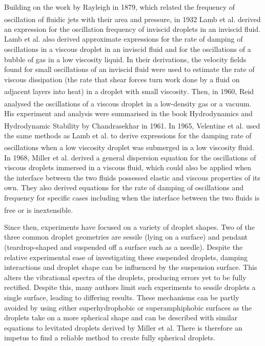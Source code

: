 \documentclass{physics_article_B}
\begin{document}
    Building on the work by Rayleigh in 1879, which related the frequency of oscillation of fluidic jets with their area and pressure\textsuperscript{\cite{rayleigh}}, in 1932 Lamb et al. derived an expression for the oscillation frequency of inviscid droplets in an inviscid fluid. Lamb et al. also derived approximate expressions for the rate of damping of oscillations in a viscous droplet in an inviscid fluid and for the oscillations of a bubble of gas in a low viscosity liquid. In their derivations, the velocity fields found for small oscillations of an inviscid fluid were used to estimate the rate of viscous dissipation (the rate that shear forces turn work done by a fluid on adjacent layers into heat) in a droplet with small viscosity\textsuperscript{\cite{lamb}}. Then, in 1960, Reid analysed the oscillations of a viscous droplet in a low-density gas or a vacuum\textsuperscript{\cite{reid}}. His experiment and analysis were summarised in the book Hydrodynamics and Hydrodynamic Stability by Chandrasekhar in 1961\textsuperscript{\cite{chandrasekhar}}. In 1965, Velentine et al. used the same methods as Lamb et al. to derive expressions for the damping rate of oscillations when a low viscosity droplet was submerged in a low viscosity fluid\textsuperscript{\cite{velentine}}. In 1968, Miller et al. derived a general dispersion equation for the oscillations of viscous droplets immersed in a viscous fluid, which could also be applied when the interface between the two fluids possessed elastic and viscous properties of its own. They also derived equations for the rate of damping of oscillations and frequency for specific cases including when the interface between the two fluids is free or is inextensible\textsuperscript{\cite{miller}}.
    
    Since then, experiments have focused on a variety of droplet shapes. Two of the three common droplet geometries are sessile (lying on a surface)\cite{Temperton2012, vukasinovic, Backholm2017} and pendant (teardrop-shaped and suspended off a surface such as a needle)\cite{Temperton2012}. Despite the relative experimental ease of investigating these suspended droplets, damping interactions and droplet shape can be influenced by the suspension surface\cite{Sharp2011}. This alters the vibrational spectra of the droplets, producing errors yet to be fully rectified\cite{harrold}. Despite this, many authors limit such experiments to sessile droplets a single surface\cite{Sharp2011}, leading to differing results. These mechanisms can be partly avoided by using either superhydrophobic or superamphiphobic surfaces as the droplets take on a more spherical shape and can be described with similar equations to levitated droplets derived by Miller et al. There is therefore an impetus to find a reliable method to create fully spherical droplets.
    
\end{document}
